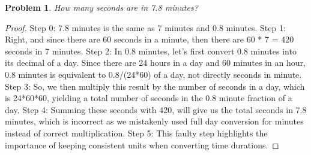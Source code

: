\documentclass{article}
\newtheorem{theorem}{Problem}
\begin{document}
\begin{theorem}
How many seconds are in 7.8 minutes?
\end{theorem}

\begin{proof}
Step 0: 7.8 minutes is the same as 7 minutes and 0.8 minutes.
Step 1: Right, and since there are 60 seconds in a minute, then there are 60 * 7 = 420 seconds in 7 minutes.
Step 2: In 0.8 minutes, let's first convert 0.8 minutes into its decimal of a day. Since there are 24 hours in a day and 60 minutes in an hour, 0.8 minutes is equivalent to 0.8/(24*60) of a day, not directly seconds in minute.
Step 3: So, we then multiply this result by the number of seconds in a day, which is 24*60*60, yielding a total number of seconds in the 0.8 minute fraction of a day.
Step 4: Summing these seconds with 420, will give us the total seconds in 7.8 minutes, which is incorrect as we mistakenly used full day conversion for minutes instead of correct multiplication.
Step 5: This faulty step highlights the importance of keeping consistent units when converting time durations.
\end{proof}
\end{document}
